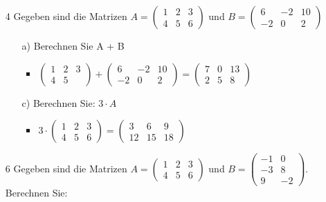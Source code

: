 \documentclass{article}
\begin{document}
\begin{itemize}
		\item[4]{Gegeben sind die Matrizen $A=\begin{pmatrix} 1 & 2 & 3 \\ 4 & 5 & 6 \end{pmatrix}$ und $B=\begin{pmatrix} 6 & -2 & 10 \\ -2 & 0 & 2 \end{pmatrix}$}
		\begin{itemize}
			\item[a)]{Berechnen Sie A + B}
			\begin{itemize}
				\item{$\begin{pmatrix} 1 & 2 & 3 \\ 4 & 5 & \end{pmatrix}+\begin{pmatrix} 6 & -2 & 10 \\ -2 & 0 & 2 \end{pmatrix}=\begin{pmatrix} 7 & 0 & 13 \\ 2 & 5 & 8 \end{pmatrix}$}
			\end{itemize}
			\item[c)]{Berechnen Sie: $3 \cdot A$}
			\begin{itemize}
				\item{$3\cdot\begin{pmatrix} 1 & 2 & 3 \\ 4 & 5 & 6 \end{pmatrix}=\begin{pmatrix} 3 & 6 & 9 \\ 12 & 15 & 18 \end{pmatrix}$}
			\end{itemize}
		\end{itemize}
		\item[6]{Gegeben sind die Matrizen $A=\begin{pmatrix} 1 & 2 & 3 \\ 4 & 5 & 6 \end{pmatrix}$ und $B=\begin{pmatrix} -1 & 0 \\ -3 & 8 \\ 9 & -2 \end{pmatrix}$. Berechnen Sie:}
		\begin{itemize}

\end{itemize}
\end{itemize}
\end{document}
